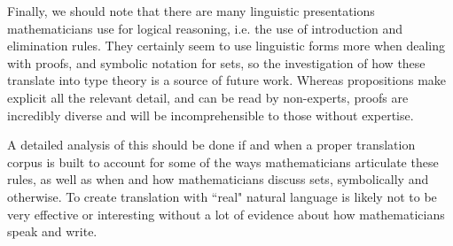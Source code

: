 Finally, we should note that there are many linguistic presentations
mathematicians use for logical reasoning, i.e. the use of introduction and
elimination rules. They certainly seem to use linguistic forms more when dealing
with proofs, and symbolic notation for sets, so the investigation of how these
translate into type theory is a source of future work. Whereas propositions make
explicit all the relevant detail, and can be read by non-experts, proofs are
incredibly diverse and will be incomprehensible to those without expertise.

A detailed analysis of this should be done if and when a proper translation
corpus is built to account for some of the ways mathematicians articulate these
rules, as well as when and how mathematicians discuss sets,
symbolically and otherwise. To create translation with ``real" natural language 
is likely not to be very effective or interesting without a lot of evidence about
how mathematicians speak and write.